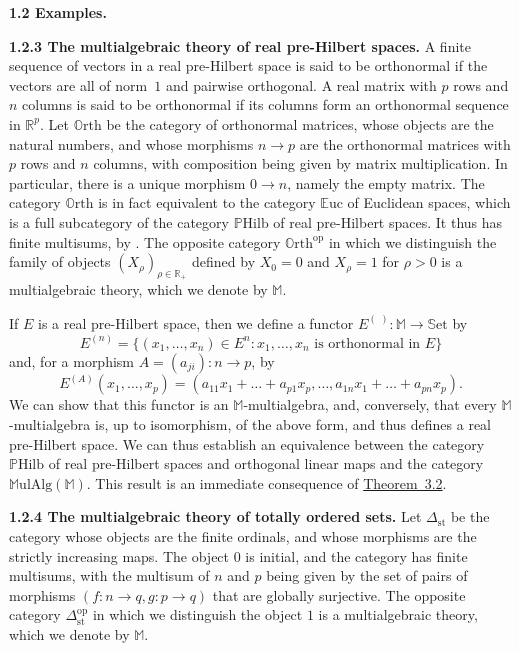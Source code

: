 \documentclass{article}
\newenvironment{rmenv}[1]
  {\phantomsection\par\medskip\noindent\textbf{#1.}\rmfamily}
  {\medskip}
\newcommand{\bb}[1]{{\mathbb{#1}}}
\newcommand{\op}{{\mathrm{op}}}
\newcommand{\st}{{\mathrm{st}}}
\newcommand{\Set}{\mathbb{S}\mathrm{et}}
\newcommand{\MulAlg}{\mathbb{M}\mathrm{ulAlg}}
\newcommand{\Orth}{\mathbb{O}\mathrm{rth}}
\newcommand{\Euc}{\mathbb{E}\mathrm{uc}}
\newcommand{\PHilb}{\mathbb{P}\mathrm{Hilb}}
\newcommand{\oldpage}[1]{\marginpar{\footnotesize$\Big\vert$ \textit{p.~#1}}}
\begin{document}
\begin{rmenv}{1.2 Examples}
  \begin{rmenv}{1.2.3 The multialgebraic theory of real pre-Hilbert spaces}
    A finite sequence of vectors in a real pre-Hilbert space is said to be orthonormal if the vectors are all of norm~$1$ and pairwise orthogonal.
    A real matrix with $p$ rows and $n$ columns is said to be orthonormal if its columns form an orthonormal sequence in $\bb{R}^p$.
    Let $\Orth$ be the category of orthonormal matrices, whose objects are the natural numbers, and whose morphisms $n\to p$ are the orthonormal matrices with $p$ rows and $n$ columns, with composition being given by matrix multiplication.
    In particular, there is a unique morphism $0\to n$, namely the empty matrix.
    The category $\Orth$ is in fact equivalent to the category $\Euc$ of Euclidean spaces, which is a full subcategory of the category $\PHilb$ of real pre-Hilbert spaces.
    It thus has finite multisums, by \cite[{}1.1.3]{2}.
    The opposite category $\Orth^\op$ in which we distinguish the family of objects $(X_\rho)_{\rho\in\bb{R}_+}$ defined by $X_0=0$ and $X_\rho=1$ for $\rho>0$ is a multialgebraic theory, which we denote by $\bb{M}$.

    If $E$ is a real pre-Hilbert space, then we define a functor $E^{(\,\,)}\colon\bb{M}\to\Set$ by
    \[
      E^{(n)} =
      \big\{
        (x_1,\ldots,x_n)\in E^n
        :
        \mbox{$x_1,\ldots,x_n$ is orthonormal in $E$}
      \big\}
    \]
    and, for a morphism $A=(a_{ji})\colon n\to p$, by
    \[
      E^{(A)}(x_1,\ldots,x_p) =
      (a_{11}x_1+\ldots+a_{p1}x_p,\ldots,a_{1n}x_1+\ldots+a_{pn}x_p).
    \]
    We can show that this functor is an $\bb{M}$-multialgebra, and, conversely, that every $\bb{M}$-multialgebra is, up to isomorphism, of the above form, and thus defines a real pre-Hilbert space.
    We can thus establish an equivalence between the category $\PHilb$ of real pre-Hilbert spaces and orthogonal linear maps and the category $\MulAlg(\bb{M})$.
    This result is an immediate consequence of \hyperref[theorem-3.2]{Theorem~3.2}.
  \end{rmenv}

  \begin{rmenv}{1.2.4 The multialgebraic theory of totally ordered sets}
    Let $\Delta_\st$ be the category whose objects are the finite ordinals, and whose morphisms are the
\oldpage{197}
    strictly increasing maps.
    The object $0$ is initial, and the category has finite multisums, with the multisum of $n$ and $p$ being given by the set of pairs of morphisms $(f\colon n\to q,g\colon p\to q)$ that are globally surjective.
    The opposite category $\Delta_\st^\op$ in which we distinguish the object $1$ is a multialgebraic theory, which we denote by $\bb{M}$.


\end{rmenv}
\end{rmenv}
\end{document}
